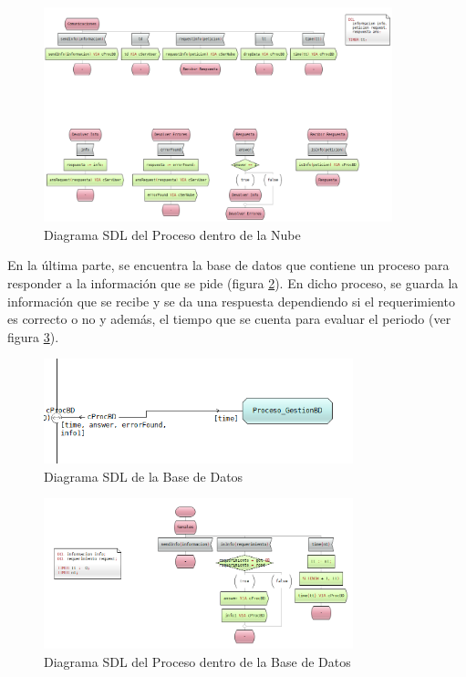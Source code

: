\begin{figure}[h]
    \centering
    \includegraphics[width=0.9\textwidth]{images/SDL_ProcesoBD.png}
    \caption{Diagrama SDL del Proceso dentro de la Nube}
    \label{SDL_Pnube}
\end{figure}

En la última parte, se encuentra la base de datos que contiene un proceso para responder a la información que se pide (figura \ref{SDL_BaseDeDatos}). En dicho proceso, se guarda la información que se recibe y se da una respuesta dependiendo si el requerimiento es correcto o no y además, el tiempo que se cuenta para evaluar el periodo (ver figura \ref{SDL_Pbd}).

\begin{figure}[h]
    \centering
    \includegraphics[width=0.8\textwidth]{images/SDL_BaseDeDatos.png}
    \caption{Diagrama SDL de la Base de Datos}
    \label{SDL_BaseDeDatos}
\end{figure}

\begin{figure}[h]
    \centering
    \includegraphics[width=0.8\textwidth]{images/SDL_ProcesoGestionBD.png}
    \caption{Diagrama SDL del Proceso dentro de la Base de Datos}
    \label{SDL_Pbd}
\end{figure}

